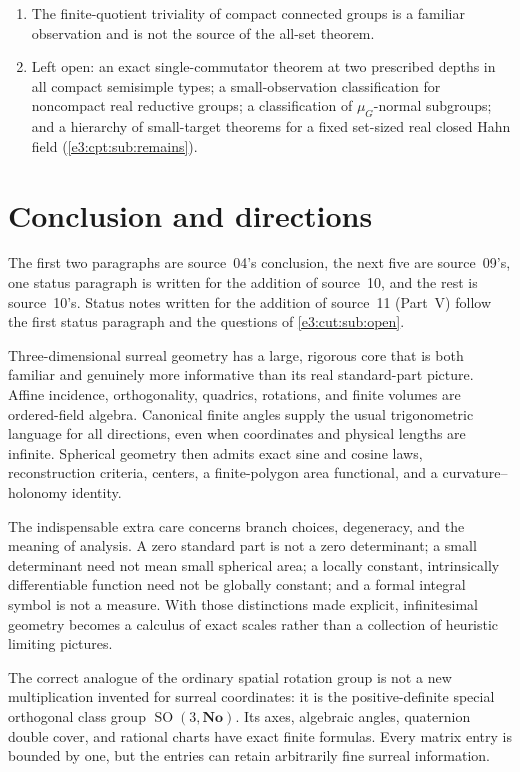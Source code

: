 \documentclass[11pt,letterpaper]{article}
\numberwithin{equation}{section}
\theoremstyle{definition}
\theoremstyle{remark}
\newcommand{\No}{\mathbf{No}}
\newcommand{\Oz}{\mathbf{Oz}}
\newcommand{\SO}{\operatorname{SO}}
\begin{document}
\begin{enumerate}[label=\textup{P\arabic*.},leftmargin=2.6em]
 infinite-dimensional Hilbert theory and no classification of arithmetic
 homomorphisms from $\Oz$ is used or established.
\item The finite-quotient triviality of compact connected groups is a familiar
 observation and is not the source of the all-set theorem.
\item Left open: an exact single-commutator theorem at two prescribed depths in
 all compact semisimple types; a small-observation classification for
 noncompact real reductive groups; a classification of $\mu_G$-normal
 subgroups; and a hierarchy of small-target theorems for a fixed set-sized
 real closed Hahn field (\cref{e3:cpt:sub:remains}).
\end{enumerate}

\section{Conclusion and directions}\label{e3:sec:conclusion}

The first two paragraphs are source~04's conclusion, the next five are
source~09's, one status paragraph is written for the addition of source~10, and
the rest is source~10's. Status notes written for the addition of source~11
(Part~V) follow the first status paragraph and the questions of
\cref{e3:cut:sub:open}.

Three-dimensional surreal geometry has a large, rigorous core that is
both familiar and genuinely more informative than its real standard-part
picture. Affine incidence, orthogonality, quadrics, rotations, and finite
volumes are ordered-field algebra. Canonical finite angles supply the
usual trigonometric language for all directions, even when coordinates
and physical lengths are infinite. Spherical geometry then admits exact
sine and cosine laws, reconstruction criteria, centers, a finite-polygon
area functional, and a curvature--holonomy identity.

The indispensable extra care concerns branch choices, degeneracy, and
the meaning of analysis. A zero standard part is not a zero determinant;
a small determinant need not mean small spherical area; a locally
constant, intrinsically differentiable function need not be globally constant; and a
formal integral symbol is not a measure. With those distinctions made
explicit, infinitesimal geometry becomes a calculus of exact scales
rather than a collection of heuristic limiting pictures.

The correct analogue of the ordinary spatial rotation group is not a new
multiplication invented for surreal coordinates: it is the positive-definite
special orthogonal class group \(\SO(3,\No)\). Its axes, algebraic angles,
quaternion double cover, and rational charts have exact finite formulas.
Every matrix entry is bounded by one, but the entries can retain arbitrarily
fine surreal information.
\end{document}
